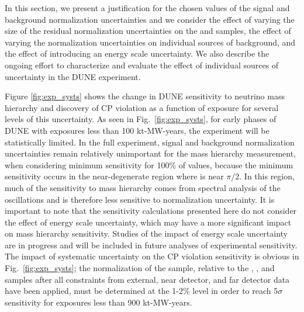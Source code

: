 In this section, we present a justification for the chosen values of the signal and background
normalization uncertainties and we consider the effect of varying the size of the residual normalization
uncertainties on the \nue and \anue samples, the effect of varying the normalization uncertainties
on individual sources of background, and the effect of introducing an energy scale uncertainty.
We also describe the ongoing effort to characterize and evaluate the effect of individual sources
of uncertainty in the DUNE experiment.

Figure \ref{fig:exp_systs} shows the
change in DUNE sensitivity to neutrino mass hierarchy and discovery of CP violation
as a function of exposure for several levels of this uncertainty.
As seen in Fig.~\ref{fig:exp_systs}, for early phases of DUNE
with exposures less than 100 kt-MW-years, the experiment
will be statistically limited. In the full experiment, signal and
background normalization uncertainties remain
relatively unimportant for the mass hierarchy measurement, when considering
minimum sensitivity for 100\% of \deltacp values, because the minimum sensitivity 
occurs in the near-degenerate region where \deltacp is near $\pi/2$. In this
region, much of the sensitivity to mass hierarchy comes from spectral analysis of
the oscillations and is therefore less sensitive to normalization uncertainty.
It is important to note that the sensitivity calculations presented here do not
consider the effect of energy scale uncertainty, which may have a more significant
impact on mass hierarchy sensitivity. Studies of the impact of energy scale 
uncertainty are in progress and will be included in future analyses of experimental
sensitivity. The impact of systematic uncertainty on the CP violation sensitivity
is obvious in Fig.~\ref{fig:exp_systs}; the normalization of the \nue sample,
relative to the \anue, \numu, and \anumu samples after all constraints from
external, near detector, and far detector data have been applied, must be determined 
at the 1-2\% level in order to reach 5$\sigma$ sensitivity for exposures less 
than 900 kt-MW-years.

